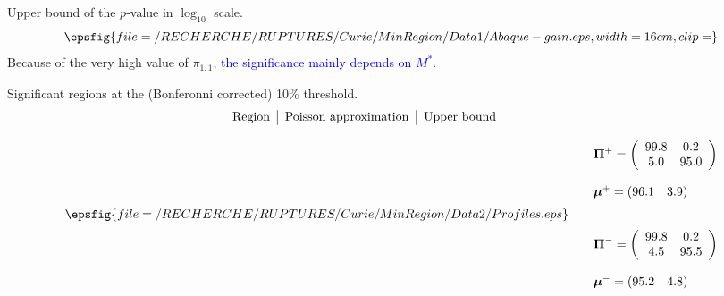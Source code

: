 \documentclass[dvips, lscape]{foils}
\newcommand{\mubf}{\mbox{\mathversion{bold}{$\mu$}}}
\newcommand{\Pibf}{\mbox{\mathversion{bold}{$\Pi$}}}
\newcommand{\textblue}[1]{\textcolor{blue}{#1}}
\newcommand{\subsection}[1]{
  \addtocounter{subsection}{1}
  {\noindent{\large \textblue{#1}}}
  }
\newcommand{\paragraph}[1]{\noindent{\textblue{#1}}}
\newcommand{\emphase}[1]{\textblue{#1}}
\begin{document}
\paragraph{Abacus for gains.} Upper bound of the $p$-value in
$\log_{10}$ scale.
$$
\epsfig{file=/RECHERCHE/RUPTURES/Curie/MinRegion/Data1/Abaque-gain.eps,
  width=16cm, clip=}
$$
Because of the very high value of $\pi_{1, 1}$, \emphase{the
  significance mainly depends on $M^*$}.

\newpage
\subsection{Results for raw profiles}

Significant regions at the (Bonferonni corrected) 10\% threshold.
{\small
$$
\hspace{-1.5cm}
\begin{tabular}{rrrrr|ccc|cc}
  \multicolumn{5}{c|}{Region} & \multicolumn{3}{c|}{Poisson approximation}
  & \multicolumn{2}{c}{Upper bound} \\
  
\end{tabular}
$$
}

\newpage
\subsection{Results for smoothed  profiles}

$$
\begin{array}{cc}
  \begin{array}{c}
    \epsfig{file=/RECHERCHE/RUPTURES/Curie/MinRegion/Data2/Profiles.eps}
  \end{array}
  & 
  \begin{array}{l}
    \Pibf^+ = \left(\begin{array}{cc}
        99.8   &       0.2 \\
        5.0     &      95.0
      \end{array}
    \right) \\ \\
    \mubf^+ = (96.1 \quad  3.9) \\
    \\ \\
    \Pibf^- = \left(\begin{array}{cc}
        99.8 &         0.2 \\
        4.5  &       95.5
      \end{array}
    \right) \\ \\
    \mubf^- = (95.2 \quad 4.8) \\
  \end{array}
\end{array}
$$
\end{document}
